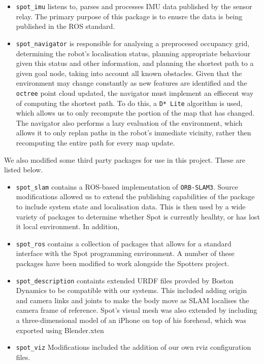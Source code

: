 \documentclass[10pt,english]{article}
\begin{document}
\begin{itemize}[noitemsep]
    \item \texttt{spot\_imu} listens to, parses and processes IMU data published by the sensor relay. The primary purpose of this package is to enusre the data is being published in the ROS standard.
    \item \texttt{spot\_navigator} is responsible for analysing a preprocesed occupancy grid, determining the robot's localisation status, planning appropriate behaviour given this status and other information, and planning the shortest path to a given goal node, taking into account all known obstacles. Given that the environment may change constantly as new features are identified and the \texttt{octree} point cloud updated, the navigator must implement an effiecent way of computing the shortest path. To do this, a \texttt{D* Lite} algorithm is used, which allows us to only recompute the portion of the map that has changed. The navigator also performs a lazy evaluation of the environment, which allows it to only replan paths in the robot's immediate vicinity, rather then recomputing the entire path for every map update.
\end{itemize}

We also modified some third party packages for use in this project. These are listed below.

\begin{itemize}[noitemsep]
    \item \texttt{spot\_slam} contains a ROS-based implementation of \texttt{ORB-SLAM3}. Source modifications allowed us to extend the publishing capabilities of the package to include system state and localisation data. This is then used by a wide variety of packages to determine whether Spot is currently healhty, or has lost it local environment. In addition,
    \item \texttt{spot\_ros} contains a collection of packages that allows for a standard interface with the Spot programming environment. A number of these packages have been modified to work alongside the Spotters project.
    \item \texttt{spot\_description} containts extended URDF files provded by Boston Dynamics to be compatible with our systems. This included adding origin and camera links and joints to make the body move as SLAM localises the camera frame of reference. Spot's visual mesh was also extended by including a three-dimensional model of an iPhone on top of his forehead, which was exported using Blender.xten
    \item \texttt{spot\_viz} Modifications included the addition of our own rviz configuration files.
\end{itemize}
\end{document}
